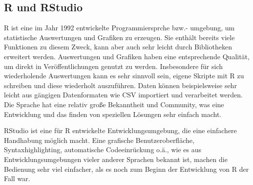 \subsection{R und RStudio}

R ist eine im Jahr 1992 entwickelte Programmiersprche bzw.- umgebung, um statistische Auswertungen und Grafiken zu erzeugen. Sie enthält bereits viele Funktionen zu diesem Zweck, kann aber auch sehr leicht durch Bibliotheken erweitert werden. Auswertungen und Grafiken haben eine entsprechende Qualität, um direkt in Veröffentlichungen genutzt zu werden. Insbesondere für sich wiederholende Auswertungen kann es sehr sinnvoll sein, eigene Skripte mit R zu schreiben und diese wiederholt auszuführen. Daten können beispielsweise sehr leicht aus gängigen Datenformaten wie CSV importiert und verarbeitet werden. Die Sprache hat eine relativ große Bekanntheit und Community, was eine Entwicklung und das finden von speziellen Lösungen sehr einfach macht. \cite{r}

RStudio ist eine für R entwickelte Entwicklungsumgebung, die eine einfachere Handhabung möglich macht. Eine grafische Benutzeroberfläche, Syntaxhighlighting, automatische Codeeinrückung o.ä., wie es aus Entwicklungsumgebungen vieler anderer Sprachen bekannt ist, machen die Bedienung sehr viel einfacher, als es noch zum Beginn der Entwicklung von R der Fall war. \cite{rstudio}



